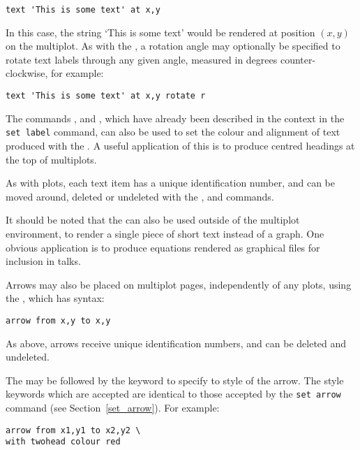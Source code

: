 \begin{verbatim} 
text 'This is some text' at x,y
\end{verbatim}

In this case, the string `This is some text' would be rendered at position
$(x,y)$ on the multiplot. As with the , a rotation angle
may optionally be specified to rotate text labels through any given angle,
measured in degrees counter-clockwise, for example:

\begin{verbatim} 
text 'This is some text' at x,y rotate r
\end{verbatim}

The commands ,  and
, which have already been described in the context in
the {\tt set label} command, can also be used to set the colour and alignment
of text produced with the .  A useful application of this is to
produce centred headings at the top of multiplots.

As with plots, each text item has a unique identification number, and can be
moved around, deleted or undeleted with the ,
 and  commands.

It should be noted that the  can also be used outside of the
multiplot environment, to render a single piece of short text instead of a
graph. One obvious application is to produce equations rendered as graphical
files for inclusion in talks.

\label{arrows} Arrows may also be placed on multiplot pages, independently of
any plots, using the , which has syntax:

\begin{verbatim} 
arrow from x,y to x,y
\end{verbatim}

As above, arrows receive unique identification numbers, and can be deleted and
undeleted.

The  may be followed by the  keyword to specify to
style of the arrow. The style keywords which are accepted are identical to
those accepted by the {\tt set arrow} command (see Section~\ref{set_arrow}).
For example:

\begin{verbatim} 
arrow from x1,y1 to x2,y2 \
with twohead colour red
\end{verbatim}

